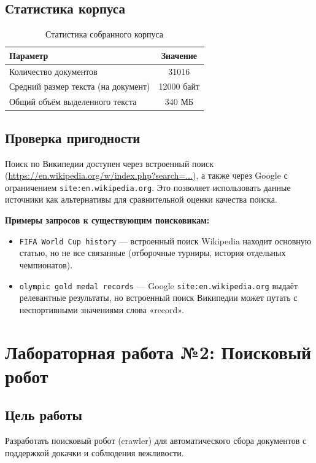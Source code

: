 \documentclass[a4paper,12pt]{article}
\begin{document}
\subsection{Статистика корпуса}
\begin{table}[H]
\centering
\begin{tabular}{|l|c|}
\hline
\textbf{Параметр} & \textbf{Значение} \\
\hline
Количество документов & 31016 \\
\hline
Средний размер текста (на документ) & 12000 байт \\
\hline
Общий объём выделенного текста & 340 МБ \\
\hline
\end{tabular}
\caption{Статистика собранного корпуса}
\end{table}

\subsection{Проверка пригодности}
Поиск по Википедии доступен через встроенный поиск (\url{https://en.wikipedia.org/w/index.php?search=...}), а также через Google с ограничением \texttt{site:en.wikipedia.org}. Это позволяет использовать данные источники как альтернативы для сравнительной оценки качества поиска.

\textbf{Примеры запросов к существующим поисковикам:}
\begin{itemize}
    \item \texttt{FIFA World Cup history} — встроенный поиск Wikipedia находит основную статью, но не все связанные (отборочные турниры, история отдельных чемпионатов).
    \item \texttt{olympic gold medal records} — Google \texttt{site:en.wikipedia.org} выдаёт релевантные результаты, но встроенный поиск Википедии может путать с неспортивными значениями слова «record».
\end{itemize}

\section{Лабораторная работа №2: Поисковый робот}

\subsection{Цель работы}
Разработать поисковый робот (crawler) для автоматического сбора документов с поддержкой докачки и соблюдения вежливости.
\end{document}
